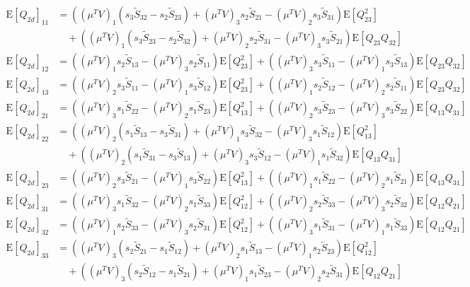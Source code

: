 \documentclass[10pt]{article}
\newcommand{\expect}[1]{\ensuremath{\mathrm{E}\left[ #1 \right]}}
\begin{document}
\begin{align} \label{eqn:Q2d}
	\expect{Q_{2d}}_{11} &= \left( (\mu^TV)_1(s_3\tilde{S}_{32}-s_2\tilde{S}_{23}) + (\mu^TV)_3s_2\tilde{S}_{21} - (\mu^TV)_2s_3\tilde{S}_{31} \right) \expect{Q_{23}^2} \nonumber \\
	& \quad + \left( (\mu^TV)_1(s_3\tilde{S}_{23}-s_2\tilde{S}_{32}) + (\mu^TV)_2s_2\tilde{S}_{31} - (\mu^TV)_3s_3\tilde{S}_{21} \right) \expect{Q_{23}Q_{32}} \nonumber \\
	\expect{Q_{2d}}_{12} &= \left( (\mu^TV)_1s_2\tilde{S}_{13} - (\mu^TV)_3s_2\tilde{S}_{11} \right) \expect{Q_{23}^2} + \left( (\mu^TV)_3s_3\tilde{S}_{11} - (\mu^TV)_1s_3\tilde{S}_{13} \right) \expect{Q_{23}Q_{32}} \nonumber \\
	\expect{Q_{2d}}_{13} &= \left( (\mu^TV)_2s_3\tilde{S}_{11} - (\mu^TV)_1s_3\tilde{S}_{12} \right) \expect{Q_{23}^2} + \left( (\mu^TV)_1s_2\tilde{S}_{12} - (\mu^TV)_2s_2\tilde{S}_{11} \right) \expect{Q_{23}Q_{32}} \nonumber \\
	\expect{Q_{2d}}_{21} &= \left( (\mu^TV)_3s_1\tilde{S}_{22} - (\mu^TV)_2s_1\tilde{S}_{23} \right) \expect{Q_{13}^2} + \left( (\mu^TV)_2s_3\tilde{S}_{23} - (\mu^TV)_3s_3\tilde{S}_{22} \right) \expect{Q_{13}Q_{31}} \nonumber \\
	\expect{Q_{2d}}_{22} &= \left( (\mu^TV)_2(s_1\tilde{S}_{13}-s_3\tilde{S}_{31}) + (\mu^TV)_1s_3\tilde{S}_{32} - (\mu^TV)_3s_1\tilde{S}_{12} \right) \expect{Q_{13}^2} \nonumber \\ 
	& \quad + \left( (\mu^TV)_2(s_1\tilde{S}_{31}-s_3\tilde{S}_{13}) + (\mu^TV)_3s_3\tilde{S}_{12} - (\mu^TV)_1s_1\tilde{S}_{32} \right) \expect{Q_{13}Q_{31}} \nonumber \\
	\expect{Q_{2d}}_{23} &= \left( (\mu^TV)_2s_3\tilde{S}_{21} - (\mu^TV)_1s_3\tilde{S}_{22} \right) \expect{Q_{13}^2} + \left( (\mu^TV)_1s_1\tilde{S}_{22} - (\mu^TV)_2s_1\tilde{S}_{21} \right) \expect{Q_{13}Q_{31}} \nonumber \\
	\expect{Q_{2d}}_{31} &= \left( (\mu^TV)_3s_1\tilde{S}_{32} - (\mu^TV)_2s_1\tilde{S}_{33} \right) \expect{Q_{12}^2} + \left( (\mu^TV)_2s_2\tilde{S}_{33}-(\mu^TV)_3s_2\tilde{S}_{32} \right) \expect{Q_{12}Q_{21}} \nonumber \\
	\expect{Q_{2d}}_{32} &= \left( (\mu^TV)_1s_2\tilde{S}_{33} - (\mu^TV)_3s_2\tilde{S}_{31} \right) \expect{Q_{12}^2} + \left( (\mu^TV)_3s_1\tilde{S}_{31} - (\mu^TV)_1s_1\tilde{S}_{33} \right) \expect{Q_{12}Q_{21}} \nonumber \\
	\expect{Q_{2d}}_{33} &= \left( (\mu^TV)_3(s_2\tilde{S}_{21}-s_1\tilde{S}_{12}) + (\mu^TV)_2s_1\tilde{S}_{13} - (\mu^TV)_1s_2\tilde{S}_{23} \right) \expect{Q_{12}^2} \nonumber \\
	& \quad + \left( (\mu^TV)_3(s_2\tilde{S}_{12}-s_1\tilde{S}_{21}) + (\mu^TV)_1s_1\tilde{S}_{23} - (\mu^TV)_2s_2\tilde{S}_{31} \right) \expect{Q_{12}Q_{21}}
\end{align}
\end{document}
